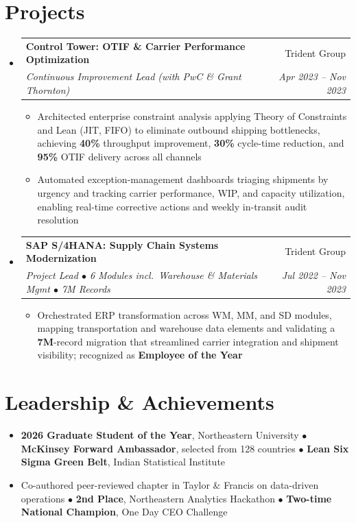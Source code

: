 \documentclass[letterpaper,10pt]{article}
\makeatletter
\newcommand{\resumeSubheading}[4]{
  \vspace{1pt}\item
    \begin{tabular*}{0.97\textwidth}[t]{l@{\extracolsep{\fill}}r}
      \textbf{#1} & #2 \\
      \textit{\small#3} & \textit{\small #4} \\
    \end{tabular*}\vspace{-4pt}
}
\newcommand{\resumeItem}[1]{\item\small{{#1 \vspace{-1pt}}}}
\newcommand{\resumeItemListStart}{\begin{itemize}[leftmargin=0.15in, label=$\bullet$]}
\newcommand{\resumeItemListEnd}{\end{itemize}\vspace{-2pt}}
\newcommand{\resumeSubHeadingListStart}{\begin{itemize}[leftmargin=0.15in, label={}]}
\newcommand{\resumeSubHeadingListEnd}{\end{itemize}}
\makeatother
\begin{document}
\section{Projects}
\resumeSubHeadingListStart
\resumeSubheading
{Control Tower: OTIF \& Carrier Performance Optimization}{Trident Group}
{Continuous Improvement Lead (with PwC \& Grant Thornton)}{Apr 2023 -- Nov 2023}
\resumeItemListStart
\resumeItem{Architected enterprise constraint analysis applying Theory of Constraints and Lean (JIT, FIFO) to eliminate outbound shipping bottlenecks, achieving \textbf{40\%} throughput improvement, \textbf{30\%} cycle-time reduction, and \textbf{95\%} OTIF delivery across all channels}
\resumeItem{Automated exception-management dashboards triaging shipments by urgency and tracking carrier performance, WIP, and capacity utilization, enabling real-time corrective actions and weekly in-transit audit resolution}
\resumeItemListEnd
\resumeSubheading
{SAP S/4HANA: Supply Chain Systems Modernization}{Trident Group}
{Project Lead $\bullet$ 6 Modules incl.\ Warehouse \& Materials Mgmt $\bullet$ 7M Records}{Jul 2022 -- Nov 2023}
\resumeItemListStart
\resumeItem{Orchestrated ERP transformation across WM, MM, and SD modules, mapping transportation and warehouse data elements and validating a \textbf{7M}-record migration that streamlined carrier integration and shipment visibility; recognized as \textbf{Employee of the Year}}
\resumeItemListEnd
\resumeSubHeadingListEnd

\section{Leadership \& Achievements}
\resumeItemListStart
\resumeItem{\textbf{2026 Graduate Student of the Year}, Northeastern University $\bullet$ \textbf{McKinsey Forward Ambassador}, selected from 128 countries $\bullet$ \textbf{Lean Six Sigma Green Belt}, Indian Statistical Institute}
\resumeItem{Co-authored peer-reviewed chapter in Taylor \& Francis on data-driven operations $\bullet$ \textbf{2nd Place}, Northeastern Analytics Hackathon $\bullet$ \textbf{Two-time National Champion}, One Day CEO Challenge}
\resumeItemListEnd
\end{document}
